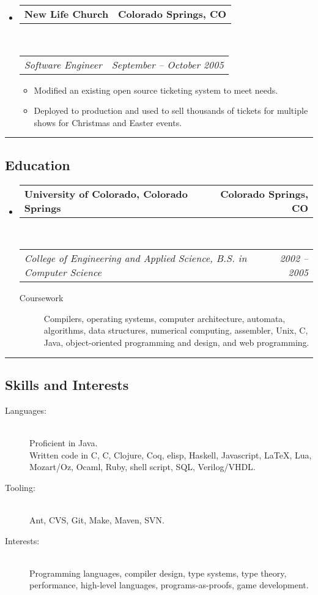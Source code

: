 \documentclass[10pt,letterpaper]{article}
\makeatletter
\newenvironment{indentsection}[1]%
{\begin{list}{}%
	{\setlength{\leftmargin}{#1}}%
	\item[]%
}
{\end{list}}
\newcommand{\headerrow}[2]
{\begin{tabular*}{\linewidth}{l@{\extracolsep{\fill}}r}
	#1 &
	#2 \\
\end{tabular*}}
\newcommand{\CPP}
{C\nolinebreak[4]\hspace{-.05em}\raisebox{.22ex}{\footnotesize\bf ++}}
\makeatother
\begin{document}
\begin{itemize}
	\item
	\headerrow
		{\textbf{New Life Church}}
		{\textbf{Colorado Springs, CO}}
	\\
	\headerrow
		{\emph{Software Engineer}}
		{\emph{September -- October 2005}}
	\begin{itemize}
		\item Modified an existing open source ticketing system to meet needs.
		\item Deployed to production and used to sell thousands of tickets for multiple shows for Christmas and Easter events.
	\end{itemize}

\end{itemize}


\hrule
\vspace{-0.4em}
\subsection*{Education}

\begin{itemize}
	\parskip=0.1em

	\item
	\headerrow
		{\textbf{University of Colorado, Colorado Springs}}
		{\textbf{Colorado Springs, CO}}
	\\
	\headerrow
		{\emph{College of Engineering and Applied Science, B.S. in Computer Science}}
		{\emph{2002 -- 2005}}
	\begin{description}
		\item[Coursework] Compilers, operating systems, computer architecture, automata, algorithms, data structures, numerical computing, assembler, Unix, C, Java, object-oriented programming and design, and web programming.
	\end{description}

\end{itemize}


\hrule
\vspace{-0.4em}
\subsection*{Skills and Interests}

\begin{indentsection}{\parindent}
\begin{description}
	\item[Languages:] \ \\
	Proficient in Java. \\
	Written code in C, \CPP, Clojure, Coq, elisp, Haskell, Javascript, \LaTeX, Lua, Mozart/Oz, Ocaml, Ruby, shell script, SQL, Verilog/VHDL.
	\item[Tooling:] \ \\
	Ant, CVS, Git, Make, Maven, SVN.
	\item[Interests:] \ \\
	Programming languages, compiler design, type systems, type theory, performance, high-level languages, programs-as-proofs, game development.
\end{description}
\end{indentsection}
\end{document}
